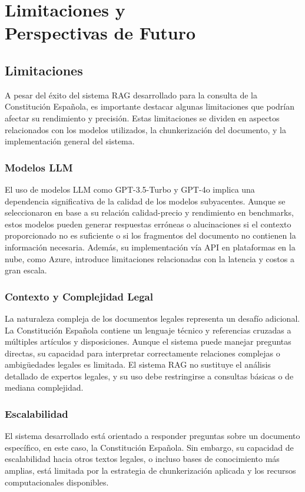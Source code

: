 
\cleardoublepage

\chapter{Limitaciones y\\ Perspectivas de Futuro}
\label{limitaciones-y-futuro}

\section{Limitaciones}

A pesar del éxito del sistema RAG desarrollado para la consulta de la Constitución Española, es importante destacar algunas limitaciones que podrían afectar su rendimiento y precisión. Estas limitaciones se dividen en aspectos relacionados con los modelos utilizados, la chunkerización del documento, y la implementación general del sistema.

\subsection{Modelos LLM}
El uso de modelos LLM como GPT-3.5-Turbo y GPT-4o implica una dependencia significativa de la calidad de los modelos subyacentes. Aunque se seleccionaron en base a su relación calidad-precio y rendimiento en benchmarks, estos modelos pueden generar respuestas erróneas o alucinaciones si el contexto proporcionado no es suficiente o si los fragmentos del documento no contienen la información necesaria. Además, su implementación vía API en plataformas en la nube, como Azure, introduce limitaciones relacionadas con la latencia y costos a gran escala.

\subsection{Contexto y Complejidad Legal}
La naturaleza compleja de los documentos legales representa un desafío adicional. La Constitución Española contiene un lenguaje técnico y referencias cruzadas a múltiples artículos y disposiciones. Aunque el sistema puede manejar preguntas directas, su capacidad para interpretar correctamente relaciones complejas o ambigüedades legales es limitada. El sistema RAG no sustituye el análisis detallado de expertos legales, y su uso debe restringirse a consultas básicas o de mediana complejidad.

\subsection{Escalabilidad}
El sistema desarrollado está orientado a responder preguntas sobre un documento específico, en este caso, la Constitución Española. Sin embargo, su capacidad de escalabilidad hacia otros textos legales, o incluso bases de conocimiento más amplias, está limitada por la estrategia de chunkerización aplicada y los recursos computacionales disponibles.


